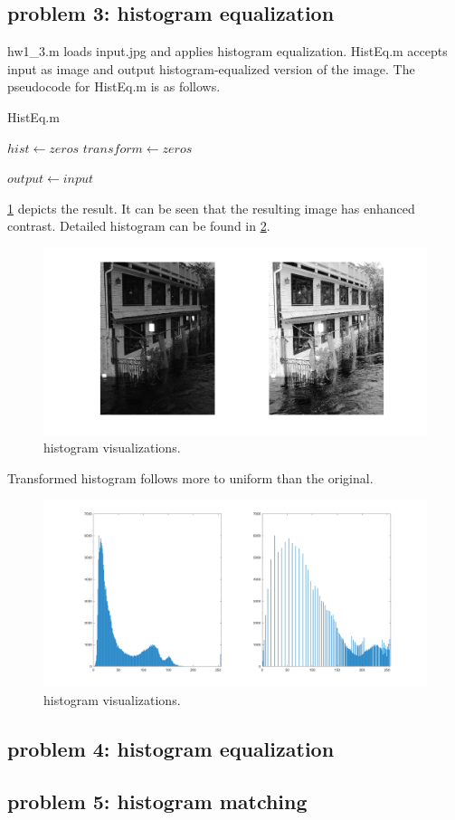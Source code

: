 \documentclass{bmvc2k}
\begin{document}
\subsection*{problem 3: histogram equalization}

hw1\_3.m loads input.jpg and applies histogram equalization.
HistEq.m accepts input as image and output histogram-equalized version of the image.
The pseudocode for HistEq.m is as follows.

\begin{algorithm}
\caption{HistEq.m}
$hist \gets zeros$\;
$transform \gets zeros$\;
    

$output \gets input$\;
\end{algorithm}

\figurename{\ref{fig:4}} depicts the result. It can be seen that the resulting
image has enhanced contrast. Detailed histogram can be found in \figurename{\ref{fig:5}}.

\begin{figure}[h]
    \centering
    \includegraphics[scale=0.25]{hw1_3}
    \caption{histogram visualizations.}
    \label{fig:4}
\end{figure}

Transformed histogram follows more to uniform than the original.

\begin{figure}[h]
    \centering
    \includegraphics[scale=0.25]{hw1_3_2}
    \caption{histogram visualizations.}
    \label{fig:5}
\end{figure}

\subsection*{problem 4: histogram equalization}

\subsection*{problem 5: histogram matching}
\end{document}
